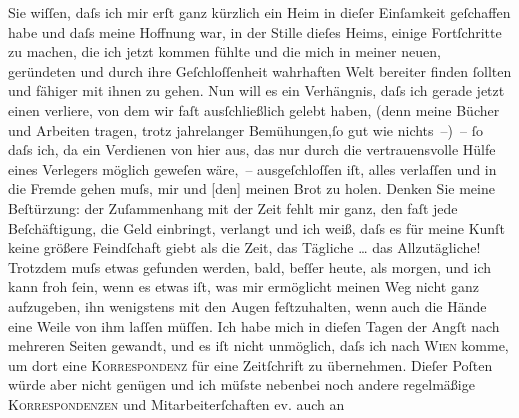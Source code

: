\pstart
           Sie wiſſen, daſs ich mir erſt ganz kürzlich ein Heim in dieſer Einſamkeit geſchaffen habe und daſs meine
               Hoffnung war, in der Stille dieſes Heims, einige Fortſchritte zu machen, die ich jetzt kommen
               fühlte und die mich in meiner neuen, geründeten und durch ihre Geſchloſſenheit
               wahrhaften Welt {\pb}bereiter finden{ }ſollten und fähiger mit
               ihnen zu gehen. Nun will es ein Verhängnis, daſs ich gerade jetzt einen \label{K_L04542-1v}\label{K_L04542-1}
               verliere, von dem wir faſt ausſchließlich gelebt haben, (denn meine Bücher und
               Arbeiten tragen, trotz jahrelanger Bemühungen,\strikeout{)}{ }ſo gut wie nichts –) –{ }ſo daſs ich, da
               ein Verdienen von hier aus, das nur durch die vertrauensvolle Hülfe eines Verlegers
               möglich geweſen wäre, – ausgeſchloſſen iſt, alles verlaſſen und in die Fremde gehen
               muſs, mir und {[}den{]} meinen Brot zu holen. Denken Sie meine
               Beſtürzung: der Zuſammenhang mit der Zeit fehlt mir ganz, den faſt jede
               Beſchäftigung, die Geld einbringt, verlangt und ich weiß, daſs es für meine Kunſt
               keine größere Feindſchaft giebt als die Zeit, das Tägliche {\dots} das Allzutägliche! Trotzdem muſs etwas gefunden werden, bald, beſſer heute, als
               morgen, und ich kann froh{ }ſein, wenn es etwas iſt, was mir ermöglicht meinen Weg
               nicht ganz aufzugeben, ihn wenigstens mit den Augen feſtzuhalten, wenn {\pb}auch die Hände eine Weile von ihm laſſen müſſen. Ich
               habe mich in dieſen Tagen der Angſt nach mehreren Seiten gewandt, und es iſt nicht
               unmöglich, daſs ich nach \textsc{Wien} komme, um dort eine
                  \textsc{Korrespondenz} für eine Zeitſchrift zu übernehmen. Dieſer
               Poſten würde aber nicht genügen und ich müſste nebenbei noch andere regelmäßige \textsc{Korrespondenzen} und Mitarbeiterſchaften ev. auch an
